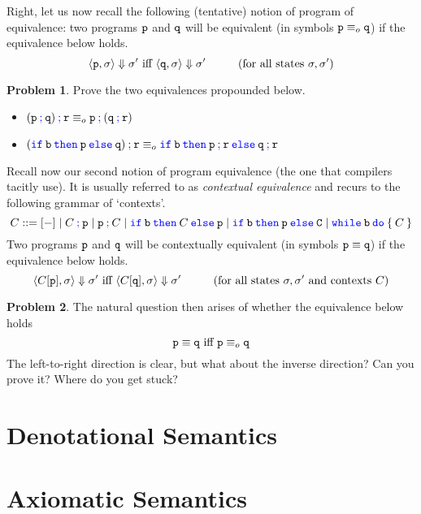 \documentclass[a4paper, 11pt]{article}
\theoremstyle{definition}
\newtheorem{problem}{Problem}
\newcommand{\blue}[1]{\textcolor{blue}{#1}}
\begin{document}
Right, let us now recall the following (tentative) notion of program of
equivalence: two programs $\mathtt{p}$ and $\mathtt{q}$ will be equivalent (in
symbols $\mathtt{p} \equiv_o \mathtt{q}$) if the equivalence below holds.
       \[
                \langle \mathtt{p}, \sigma \rangle \Downarrow \sigma'
                \text{ iff } \langle \mathtt{q}, \sigma \rangle \Downarrow \sigma'
                \hspace{1cm} (\text{for all states } \sigma,\sigma')
       \]
\begin{problem}
        Prove the two equivalences propounded below.
        \begin{itemize}
                \item $\mathtt{(p \> \blue{ ;} \> q) \> {\blue ;} \> r} \equiv_o
                        \mathtt{p \> \blue{ ;} \> (q \> {\blue ;} \> r)}$
                \item $\mathtt{(\blue{ if} \> b \> \blue{ then} \> p \> \blue{ else} \> q) 
                      \> \blue{ ;} \> \prog{r}} \equiv_o 
                      \mathtt{\blue{ if} \> b \> \blue{ then} \> p \> \blue{ ;} \> r \> 
                      \blue{ else} \> q \> \blue{ ;} \> r}$ 
        \end{itemize}
\end{problem}

Recall now our second notion of program equivalence (the one that compilers
tacitly use). It is usually referred to as \emph{contextual equivalence} and
recurs to the following grammar of `contexts'.
\[              
                C ::= [-] \mid C \> \prog{ \blue{;}} \> \prog{p} 
                \mid 
                \prog{p} \> \prog{ \blue{;}} \> C 
                \mid 
                \mathtt{\blue{ if} \> b \> \blue{ then} \>} C \mathtt{\> \blue{ else} \> p} 
                \mid
                \mathtt{\blue{ if} \> b \> \blue{ then} \>} \prog{p} \mathtt{\> \blue{ else} \> C} 
                \mid
                \mathtt{\blue{ while} \> b \> \blue{ do} \> \{ \>} C \mathtt{\> \}}
\]
Two programs $\mathtt{p}$ and $\mathtt{q}$ will be contextually equivalent (in
symbols $\mathtt{p} \equiv \mathtt{q}$) if the equivalence below holds.
\[
               \langle C[\mathtt{p}], \sigma \rangle \Downarrow \sigma'
               \text{ iff } \langle C[\mathtt{q}], \sigma \rangle \Downarrow \sigma'
               \hspace{1cm} (\text{for all states } \sigma,\sigma' \text{ and contexts } C)
\]
\begin{problem}
        The natural question then arises of whether the equivalence below holds
        \[
                \mathtt{p} \equiv \mathtt{q} \text{ iff } \mathtt{p} \equiv_o \mathtt{q} 
        \]
        The left-to-right direction is clear, but what about the inverse direction?
        Can you prove it? Where do you get stuck?
\end{problem}

\section{Denotational Semantics}

\section{Axiomatic Semantics}
\end{document}
